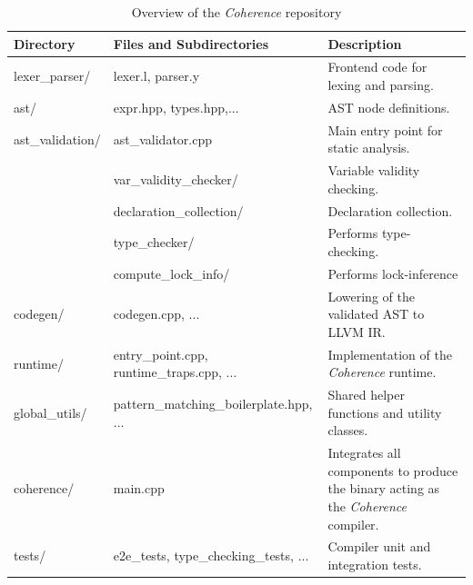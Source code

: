 \documentclass[a4paper,12pt,fleqn]{article}
\begin{document}
\begin{table}[H]
\centering
\small
\caption{Overview of the \textit{Coherence} repository}
\label{tab:repo-overview}
\begin{tabular}{l | l | p{7cm}}
\toprule
\textbf{Directory} & \textbf{Files and Subdirectories} & \textbf{Description} \\ \midrule
lexer\_parser/ & lexer.l, parser.y & Frontend code for lexing and parsing. \\ \midrule
ast/ & expr.hpp, types.hpp,...  & AST node definitions. \\ \midrule
ast\_validation/ & ast\_validator.cpp & Main entry point for static analysis. \\ 
 & var\_validity\_checker/ & Variable validity checking. \\ 
 & declaration\_collection/ & Declaration collection. \\
 & type\_checker/ & Performs type-checking. \\ 
 & compute\_lock\_info/ & Performs lock-inference \\ \midrule
codegen/ & codegen.cpp, ... & Lowering of the validated AST to LLVM IR. \\ \midrule
runtime/ & entry\_point.cpp, runtime\_traps.cpp, ... & Implementation of the \textit{Coherence} runtime. \\ \midrule
global\_utils/ & pattern\_matching\_boilerplate.hpp, ... & Shared helper functions and utility classes. \\ \midrule
coherence/ & main.cpp & Integrates all components to produce the binary acting as the \textit{Coherence} compiler. \\ \midrule
tests/ & e2e\_tests, type\_checking\_tests, ... & Compiler unit and integration tests. \\ \bottomrule
\end{tabular}
\end{table}
\printbibliography
\end{document}
